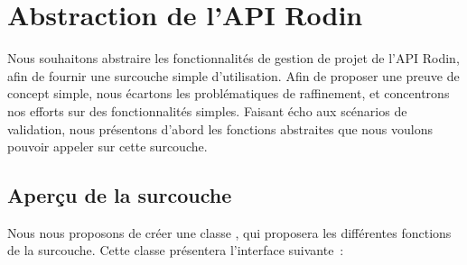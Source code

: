 \chapter{Abstraction de l'API Rodin}\label{sec:apihandle}

Nous souhaitons abstraire les fonctionnalités de gestion de projet de l'API Rodin, afin de fournir une surcouche simple d'utilisation.
Afin de proposer une preuve de concept simple, nous écartons les problématiques de raffinement, et concentrons nos efforts sur des fonctionnalités simples.
Faisant écho aux scénarios de validation, nous présentons d'abord les fonctions abstraites que nous voulons pouvoir appeler sur cette surcouche.


\section{Aperçu de la surcouche}

Nous nous proposons de créer une classe , qui proposera les différentes fonctions de la surcouche.
Cette classe présentera l'interface suivante~:

